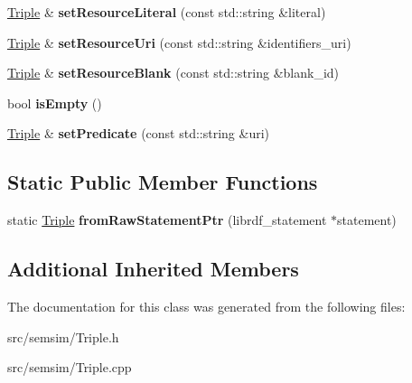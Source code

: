 \begin{DoxyCompactItemize}
\hyperlink{classsemsim_1_1Triple}{Triple} \& {\bfseries set\+Resource\+Literal} (const std\+::string \&literal)
\item 
\mbox{\label{classsemsim_1_1Triple_a09a6b7c88633a87f489a8f125897935a}} 
\hyperlink{classsemsim_1_1Triple}{Triple} \& {\bfseries set\+Resource\+Uri} (const std\+::string \&identifiers\+\_\+uri)
\item 
\mbox{\label{classsemsim_1_1Triple_a5f62f4d7c1dc8877fa7861d0b399c696}} 
\hyperlink{classsemsim_1_1Triple}{Triple} \& {\bfseries set\+Resource\+Blank} (const std\+::string \&blank\+\_\+id)
\item 
\mbox{\label{classsemsim_1_1Triple_a0dd977326ab305c6327a62b8c009f60f}} 
bool {\bfseries is\+Empty} ()
\item 
\mbox{\label{classsemsim_1_1Triple_ac61be91d0c4e21a033a0052f0bab7487}} 
\hyperlink{classsemsim_1_1Triple}{Triple} \& {\bfseries set\+Predicate} (const std\+::string \&uri)
\end{DoxyCompactItemize}
\subsection*{Static Public Member Functions}
\begin{DoxyCompactItemize}
\item 
\mbox{\label{classsemsim_1_1Triple_aec7e299bc50b39bd0421da8ab56d95f9}} 
static \hyperlink{classsemsim_1_1Triple}{Triple} {\bfseries from\+Raw\+Statement\+Ptr} (librdf\+\_\+statement $\ast$statement)
\end{DoxyCompactItemize}
\subsection*{Additional Inherited Members}


The documentation for this class was generated from the following files\+:\begin{DoxyCompactItemize}
\item 
src/semsim/Triple.\+h\item 
src/semsim/Triple.\+cpp\end{DoxyCompactItemize}
